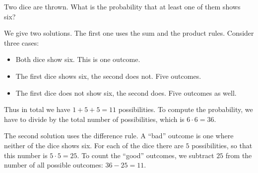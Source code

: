 

\setcounter{section}{1}
\setcounter{subsection}{3}
\setcounter{dfn}{2}

\begin{exl}
Two dice are thrown. What is the probability that at least one of them shows six?

We give two solutions.
The first one uses the sum and the product rules.
Consider three cases:
\begin{itemize}
\item
Both dice show six. This is one outcome.
\item
The first dice shows six, the second does not. Five outcomes.
\item
The first dice does not show six, the second does. Five outcomes as well.
\end{itemize}
Thus in total we have $1+5+5=11$ possibilities.
To compute the probability, we have to divide by the total number of possibilities, which is $6 \cdot 6 = 36$.

The second solution uses the difference rule.
A ``bad'' outcome is one where neither of the dice shows six.
For each of the dice there are $5$ possibilities, so that this number is $5 \cdot 5 = 25$.
To count the ``good'' outcomes, we subtract $25$ from the number of all possible outcomes:
$36-25=11$.
\end{exl}


